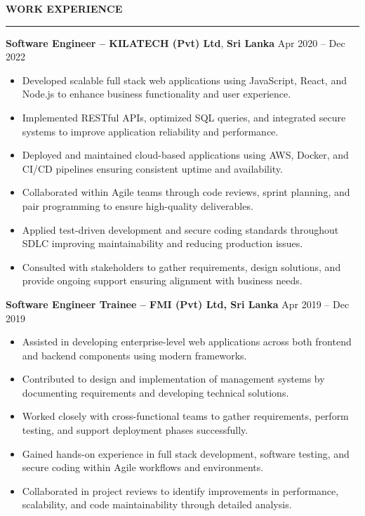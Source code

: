 \documentclass[10pt,letterpaper]{article}
\begin{document}
\textbf{WORK EXPERIENCE}\\[-8pt]
\noindent\rule{\textwidth}{1pt}

\vspace{-2pt}

\textbf{Software Engineer -- KILATECH (Pvt) Ltd}, \textbf{Sri Lanka} \hfill Apr 2020 -- Dec 2022

\vspace{-1pt}

\begin{itemize}
\item Developed scalable full stack web applications using JavaScript, React, and Node.js to enhance business functionality and user experience.
\item Implemented RESTful APIs, optimized SQL queries, and integrated secure systems to improve application reliability and performance.
\item Deployed and maintained cloud-based applications using AWS, Docker, and CI/CD pipelines ensuring consistent uptime and availability.
\item Collaborated within Agile teams through code reviews, sprint planning, and pair programming to ensure high-quality deliverables.
\item Applied test-driven development and secure coding standards throughout SDLC improving maintainability and reducing production issues.
\item Consulted with stakeholders to gather requirements, design solutions, and provide ongoing support ensuring alignment with business needs.
\end{itemize}

\textbf{Software Engineer Trainee -- FMI (Pvt) Ltd, Sri Lanka} \hfill Apr 2019 -- Dec 2019

\vspace{-1pt}

\begin{itemize}
\item Assisted in developing enterprise-level web applications across both frontend and backend components using modern frameworks.
\item Contributed to design and implementation of management systems by documenting requirements and developing technical solutions.
\item Worked closely with cross-functional teams to gather requirements, perform testing, and support deployment phases successfully.
\item Gained hands-on experience in full stack development, software testing, and secure coding within Agile workflows and environments.
\item Collaborated in project reviews to identify improvements in performance, scalability, and code maintainability through detailed analysis.
\end{itemize}
\end{document}
